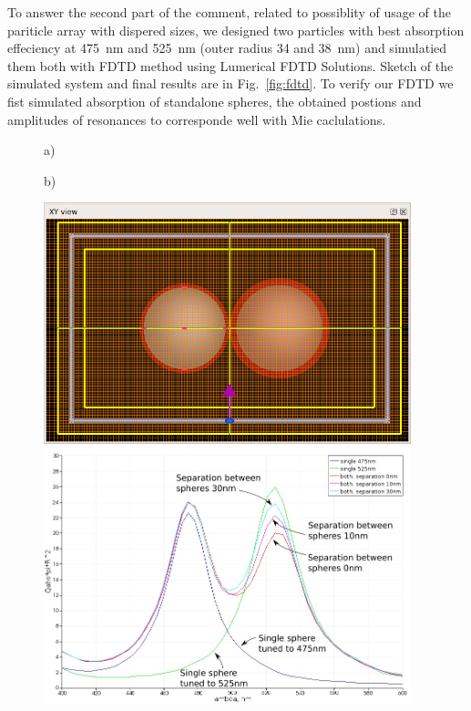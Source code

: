 \documentclass[a4paper]{article}
\begin{document}
To answer the second part of the comment, related to possiblity of
usage of the pariticle array with dispered sizes, we designed two
particles with best absorption effeciency at 475~nm and 525~nm (outer
radius 34 and 38~nm) and
simulatied them both with FDTD method using Lumerical FDTD Solutions.
Sketch of the simulated system and final results are in
Fig.~\ref{fig:fdtd}. To verify our FDTD we fist simulated absorption
of standalone spheres, the obtained postions and amplitudes of
resonances to corresponde well with Mie caclulations.
\begin{figure}
  \begin{minipage}[h]{0.49\textwidth}    \begin{flushleft}     a)    \end{flushleft}
  \end{minipage}
  \begin{minipage}[h]{0.49\textwidth}    \begin{flushleft}     b)    \end{flushleft}
  \end{minipage}
  \begin{minipage}[h]{0.49\textwidth} 
   \includegraphics[width=0.95\textwidth]{FDTD-mode-d00}
  \end{minipage}
  \begin{minipage}[h]{0.49\textwidth} 
   \includegraphics[width=0.95\textwidth]{fdtd-spectra}

\end{minipage}
\end{figure}
\end{document}
